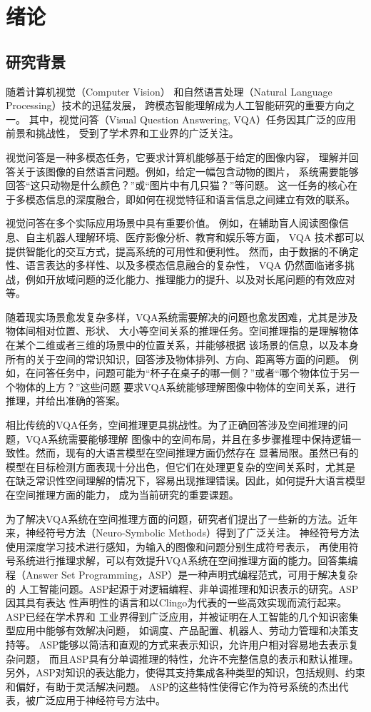 \chapter{绪论}
\section{研究背景}
随着计算机视觉（Computer Vision）
和自然语言处理（Natural Language Processing）技术的迅猛发展，
跨模态智能理解成为人工智能研究的重要方向之一。
其中，视觉问答（Visual Question Answering, VQA）\cite{goyal2017making}任务因其广泛的应用前景和挑战性，
受到了学术界和工业界的广泛关注。

视觉问答是一种多模态任务，它要求计算机能够基于给定的图像内容，
理解并回答关于该图像的自然语言问题。例如，给定一幅包含动物的图片，
系统需要能够回答“这只动物是什么颜色？”或“图片中有几只猫？”等问题。
这一任务的核心在于多模态信息的深度融合，即如何在视觉特征和语言信息之间建立有效的联系。

视觉问答在多个实际应用场景中具有重要价值。
例如，在辅助盲人阅读图像信息、自主机器人理解环境、医疗影像分析、教育和娱乐等方面，
VQA 技术都可以提供智能化的交互方式，提高系统的可用性和便利性。
然而，由于数据的不确定性、语言表达的多样性、以及多模态信息融合的复杂性，
VQA 仍然面临诸多挑战，例如开放域问题的泛化能力、推理能力的提升、以及对长尾问题的有效应对等。

随着现实场景愈发复杂多样，VQA系统需要解决的问题也愈发困难，尤其是涉及物体间相对位置、形状、
大小等空间关系的推理任务。空间推理指的是理解物体在某个二维或者三维的场景中的位置关系，并能够根据
该场景的信息，以及本身所有的关于空间的常识知识，回答涉及物体排列、方向、距离等方面的问题。
例如，在问答任务中，问题可能为“杯子在桌子的哪一侧？”或者“哪个物体位于另一个物体的上方？”这些问题
要求VQA系统能够理解图像中物体的空间关系，进行推理，并给出准确的答案。

相比传统的VQA任务，空间推理更具挑战性。为了正确回答涉及空间推理的问题，VQA系统需要能够理解
图像中的空间布局，并且在多步骤推理中保持逻辑一致性。然而，现有的大语言模型在空间推理方面仍然存在
显著局限。虽然已有的模型在目标检测方面表现十分出色，但它们在处理更复杂的空间关系时，尤其是
在缺乏常识性空间理解的情况下，容易出现推理错误。因此，如何提升大语言模型在空间推理方面的能力，
成为当前研究的重要课题。

为了解决VQA系统在空间推理方面的问题，研究者们提出了一些新的方法。近年来，神经符号方法（Neuro-Symbolic Methods）得到了广泛关注。
神经符号方法使用深度学习技术进行感知，为输入的图像和问题分别生成符号表示，
再使用符号系统进行推理求解，可以有效提升VQA系统在空间推理方面的能力。回答集编程（Answer Set Programming，ASP）是一种声明式编程范式，可用于解决复杂的
人工智能问题。ASP起源于对逻辑编程、非单调推理和知识表示的研究。ASP因其具有表达
性声明性的语言和以Clingo为代表的一些高效实现而流行起来。ASP已经在学术界和
工业界得到广泛应用，并被证明在人工智能的几个知识密集型应用中能够有效解决问题，
如调度、产品配置、机器人、劳动力管理和决策支持等。
ASP能够以简洁和直观的方式来表示知识，允许用户相对容易地去表示复杂问题，
而且ASP具有分单调推理的特性，允许不完整信息的表示和默认推理。
另外，ASP对知识的表达能力，使得其支持集成各种类型的知识，包括规则、约束和偏好，有助于灵活解决问题。
ASP的这些特性使得它作为符号系统的杰出代表，被广泛应用于神经符号方法中。

